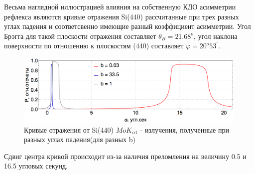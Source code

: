 Весьма наглядной иллюстрацией влияния на собственную КДО асимметрии рефлекса являются
кривые отражения Si(440) рассчитанные при
трех разных углах падения и соответсвенно имеющие разный коэффициент асимметрии. Угол
Брэгга для такой плоскости отражения составляет $\theta_B = 21.68^o$, угол наклона поверхности
 по отношению к плоскостям (440) составляет $\varphi = 20^o 53^{'}$.

\begin{figure}[H]
\centering
\includegraphics[width=0.99\textwidth]{images/rocking_curve_assym_3.png}
\caption{Кривые отражения от Si(440) $MoK_{\alpha 1}$ - излучения, полученные при разных углах падения(для разных b)}
\label{ris:rocking_curve_assym_3}
\end{figure}
Сдвиг центра кривой происходит из-за наличия преломления на величину 0.5 и 16.5 угловых секунд.
%
